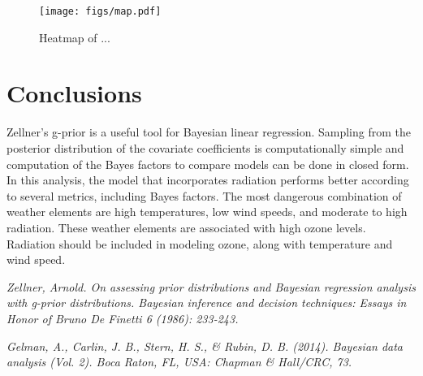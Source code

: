 \documentclass{../../tex_template/asaproc}
\begin{document}
\begin{figure}[H]
  \texttt{[image: figs/map.pdf]}
  \caption{\small Heatmap of ...}
  \label{fig:map}
\end{figure}


\section{Conclusions}
Zellner's g-prior is a useful tool for Bayesian linear regression. Sampling
from the posterior distribution of the covariate coefficients is
computationally simple and computation of the Bayes factors to compare models
can be done in closed form. In this analysis, the model that incorporates radiation
performs better according to several metrics, including Bayes factors. The most
dangerous combination of weather elements are high temperatures, low wind speeds, and
moderate to high radiation. These weather elements are associated with high ozone 
levels. Radiation should be included in modeling ozone, along with temperature and
wind speed. 

\begin{references}
{\footnotesize
\itemsep=3pt
\item {\em Zellner, Arnold. On assessing prior distributions and Bayesian regression analysis with g-prior distributions. Bayesian inference and decision techniques: Essays in Honor of Bruno De Finetti 6 (1986): 233-243.}
\item {\em Gelman, A., Carlin, J. B., Stern, H. S., \& Rubin, D. B. (2014). Bayesian data analysis (Vol. 2). Boca Raton, FL, USA: Chapman \& Hall/CRC, 73.}
}
\end{references}
\end{document}

